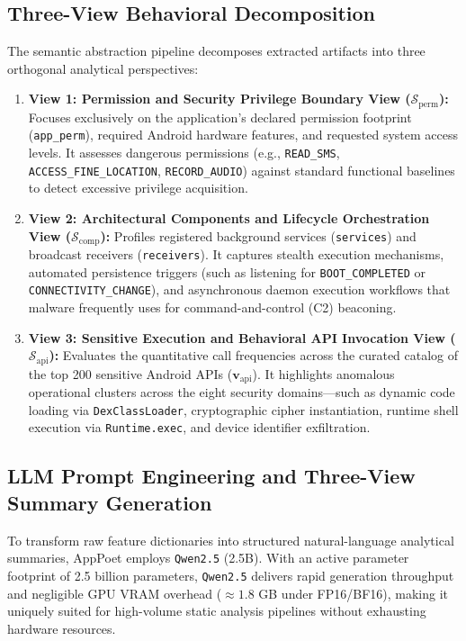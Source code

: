 \documentclass[12pt,a4paper,oneside]{report}
\begin{document}
\subsection{Three-View Behavioral Decomposition}
The semantic abstraction pipeline decomposes extracted artifacts into three orthogonal analytical perspectives:
\begin{enumerate}
    \item \textbf{View 1: Permission and Security Privilege Boundary View ($\mathcal{S}_{\text{perm}}$):} Focuses exclusively on the application's declared permission footprint (\texttt{app\_perm}), required Android hardware features, and requested system access levels. It assesses dangerous permissions (e.g., \texttt{READ\_SMS}, \texttt{ACCESS\_FINE\_LOCATION}, \texttt{RECORD\_AUDIO}) against standard functional baselines to detect excessive privilege acquisition.
    \item \textbf{View 2: Architectural Components and Lifecycle Orchestration View ($\mathcal{S}_{\text{comp}}$):} Profiles registered background services (\texttt{services}) and broadcast receivers (\texttt{receivers}). It captures stealth execution mechanisms, automated persistence triggers (such as listening for \texttt{BOOT\_COMPLETED} or \texttt{CONNECTIVITY\_CHANGE}), and asynchronous daemon execution workflows that malware frequently uses for command-and-control (C2) beaconing.
    \item \textbf{View 3: Sensitive Execution and Behavioral API Invocation View ($\mathcal{S}_{\text{api}}$):} Evaluates the quantitative call frequencies across the curated catalog of the top 200 sensitive Android APIs ($\mathbf{v}_{\text{api}}$). It highlights anomalous operational clusters across the eight security domains—such as dynamic code loading via \texttt{DexClassLoader}, cryptographic cipher instantiation, runtime shell execution via \texttt{Runtime.exec}, and device identifier exfiltration.
\end{enumerate}

\subsection{LLM Prompt Engineering and Three-View Summary Generation}
To transform raw feature dictionaries into structured natural-language analytical summaries, AppPoet employs \texttt{Qwen2.5} (2.5B). With an active parameter footprint of 2.5 billion parameters, \texttt{Qwen2.5} delivers rapid generation throughput and negligible GPU VRAM overhead ($\approx 1.8$ GB under FP16/BF16), making it uniquely suited for high-volume static analysis pipelines without exhausting hardware resources.
\end{document}

